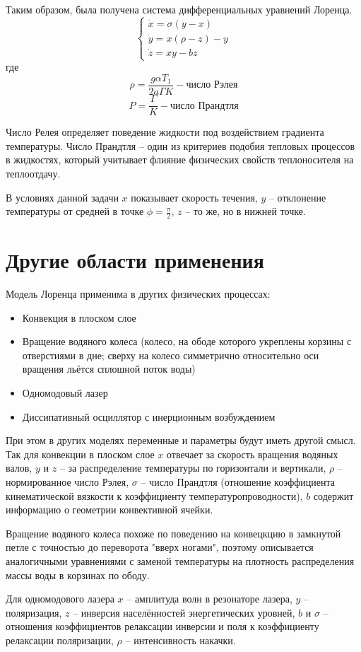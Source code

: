 \documentclass[12pt]{article}
\begin{document}
Таким образом, была получена система дифференциальных уравнений Лоренца.
$$\begin{cases}	
	\dot{x} = \sigma (y-x) \\
	\dot{y} = x(\rho-z)-y \\
	\dot{z} = xy-bz
\end{cases}$$
где 
\[ \rho = \frac{g\alpha T_1}{2a\Gamma K} - \text{число Рэлея}\]
\[P = \frac{\Gamma}{K} - \text{число Прандтля}\] 

Число Релея определяет поведение жидкости под воздействием градиента температуры. Число Прандтля -- один из критериев подобия тепловых процессов в жидкостях, который учитывает флияние физических свойств теплоносителя на теплоотдачу.

В условиях данной задачи $x$ показывает скорость течения, $y$ -- отклонение температуры от средней в точке $\phi = \frac{\pi}{2}$, $z$ -- то же, но в нижней точке.

\section{Другие области применения}

Модель Лоренца применима в других физических процессах:
\begin{itemize}
	\item Конвекция в плоском слое
	\item Вращение водяного колеса (колесо, на ободе которого укреплены корзины с отверстиями в дне; сверху на колесо симметрично относительно оси вращения льётся сплошной поток воды)
	\item Одномодовый лазер
	\item Диссипативный осциллятор с инерционным возбуждением
\end{itemize}

При этом в других моделях переменные и параметры будут иметь другой смысл. Так для конвекции в плоском слое $x$ отвечает за скорость вращения водяных валов, $y$ и $z$ -- за распределение температуры по горизонтали и вертикали, $\rho$ -- нормированное число Рэлея, $\sigma$ -- число Прандтля (отношение коэффициента кинематической вязкости к коэффициенту температуропроводности), $b$ содержит информацию о геометрии конвективной ячейки. 

Вращение водяного колеса похоже по поведению на конвецкцию в замкнутой петле с точностью до переворота "вверх ногами", поэтому описывается аналогичными уравнениями с заменой температуры на плотность распределения массы воды в корзинах по ободу.

Для одномодового лазера $x$ -- амплитуда волн в резонаторе лазера, $y$ -- поляризация, $z$ -- инверсия населённостей энергетических уровней, $b$ и $\sigma$ -- отношения коэффициентов релаксации инверсии и поля к коэффициенту релаксации поляризации, $\rho$ -- интенсивность накачки.
\end{document}
